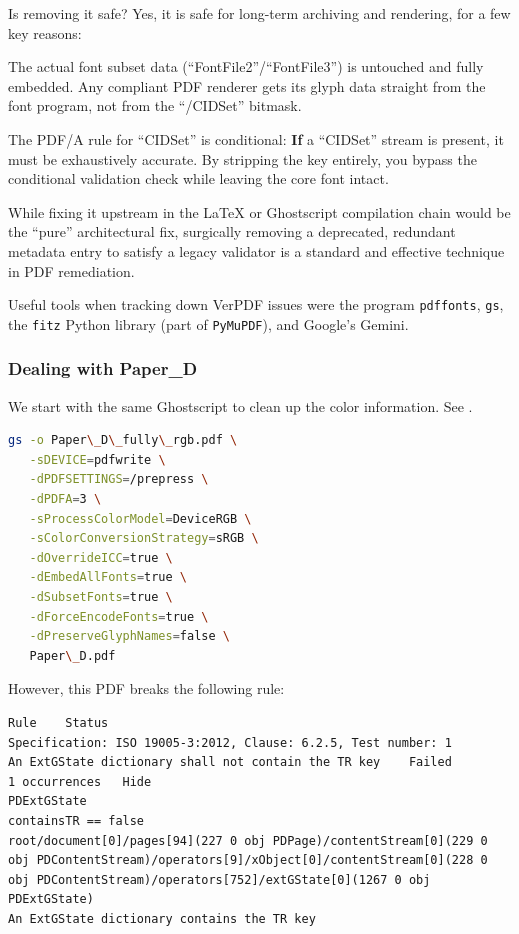 \documentclass[12pt, twoside]{article}
\begin{document}
Is removing it safe? Yes, it is safe for long-term archiving and rendering, for a few key reasons:
\begin{description}[style=nextline, labelwidth=\widthof{\textbf{The Source of Truth Remains}}, leftmargin=!]
    \item [The Source of Truth Remains] The actual font subset data (\enquote{FontFile2}/\enquote{FontFile3}) is untouched and fully embedded. Any compliant PDF renderer gets its glyph data straight from the font program, not from the \enquote{/CIDSet} bitmask.
    \item [Bypassing the Rule] The PDF/A rule for \enquote{CIDSet} is conditional: \textbf{If} a \enquote{CIDSet} stream is present, it must be exhaustively accurate. By stripping the key entirely, you bypass the conditional validation check while leaving the core font intact.
\end{description}
While fixing it upstream in the LaTeX or Ghostscript compilation chain would be the \enquote{pure} architectural fix, surgically removing a deprecated, redundant metadata entry to satisfy a legacy validator is a standard and effective technique in PDF remediation.

Useful tools when tracking down VerPDF issues were the program \texttt{pdffonts}, \texttt{gs}, the \texttt{fitz} Python library (part of \texttt{PyMuPDF}), and Google's Gemini.



\subsubsection{Dealing with Paper\_D}
\label{sec:dealingWithPaperD}
We start with the same Ghostscript to clean up the color information. See .
\begin{lstlisting}[language={bash}, caption={Using ghostscript to correct the Paper\_D PDF file},label=lst:cleanPaperD]
gs -o Paper\_D\_fully\_rgb.pdf \
   -sDEVICE=pdfwrite \
   -dPDFSETTINGS=/prepress \
   -dPDFA=3 \
   -sProcessColorModel=DeviceRGB \
   -sColorConversionStrategy=sRGB \
   -dOverrideICC=true \
   -dEmbedAllFonts=true \
   -dSubsetFonts=true \
   -dForceEncodeFonts=true \
   -dPreserveGlyphNames=false \
   Paper\_D.pdf
\end{lstlisting}

However, this \gls{PDF} breaks the following rule:
\begin{verbatim}
Rule	Status
Specification: ISO 19005-3:2012, Clause: 6.2.5, Test number: 1	
An ExtGState dictionary shall not contain the TR key	Failed
1 occurrences	Hide
PDExtGState	
containsTR == false	
root/document[0]/pages[94](227 0 obj PDPage)/contentStream[0](229 0 obj PDContentStream)/operators[9]/xObject[0]/contentStream[0](228 0 obj PDContentStream)/operators[752]/extGState[0](1267 0 obj PDExtGState)
An ExtGState dictionary contains the TR key
\end{verbatim}
\end{document}
